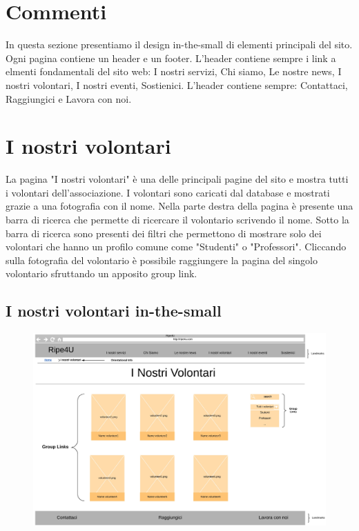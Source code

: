     \section{Commenti}
    In questa sezione presentiamo il design in-the-small di elementi principali
    del sito. Ogni pagina contiene un header e un footer. L'header contiene
    sempre i link a elmenti fondamentali del sito web: I nostri servizi, Chi
    siamo, Le nostre news, I nostri volontari, I nostri eventi, Sostienici.
    L'header contiene sempre: Contattaci, Raggiungici e Lavora con noi.
    \section{I nostri volontari}
    La pagina "I nostri volontari" è una delle principali pagine del sito e
    mostra tutti i volontari dell'associazione. I volontari sono caricati dal
    database e mostrati grazie a una fotografia con il nome. Nella parte destra
    della pagina è presente una barra di ricerca che permette di ricercare il
    volontario scrivendo il nome. Sotto la barra di ricerca sono presenti dei
    filtri che permettono di mostrare solo dei volontari che hanno un profilo
    comune come "Studenti" o "Professori". Cliccando sulla fotografia del
    volontario è possibile raggiungere la pagina del singolo volontario
    sfruttando un apposito group link.

        \subsection{I nostri volontari in-the-small}
        \begin{figure}[H]
            \centering
            \includegraphics[scale=0.40]{resources/images/iNostriVolontari-in-the-small.jpg}
        \end{figure}

